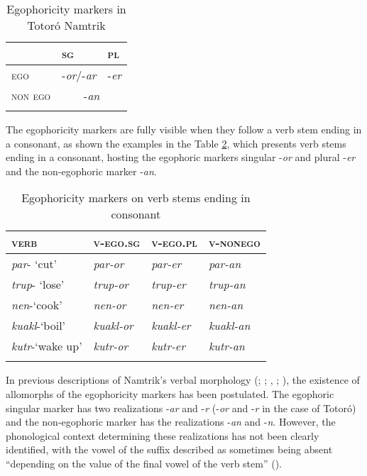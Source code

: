 \documentclass[output=paper]{langsci/langscibook}
\begin{document}
\begin{table}
\begin{tabularx}{\textwidth}{XXX}
\lsptoprule
  & \textsc{sg}  & \textsc{pl} \\
\midrule
\textsc{ego} & -\textit{or}/-\textit{ar} & -\textit{er}\\
\textsc{non ego} & \multicolumn{2}{c}{-\textit{an}}\\
\lspbottomrule
\end{tabularx}
\caption{Egophoricity markers in Totoró Namtrik}
\label{tab:gg1}
\end{table}

The egophoricity markers are fully visible when they follow a verb stem ending in a consonant, as shown the examples in the Table \ref{tab:gg2}, which presents verb stems ending in a consonant, hosting the egophoric markers singular -\textit{or} and plural -\textit{er} and the non-egophoric marker -\textit{an}.

\begin{table}
\begin{tabularx}{\textwidth}{XXXX}
\lsptoprule
\textsc{verb} & \textsc{v-ego.sg} & \textsc{v-ego.pl} & \textsc{v-nonego}\\
\midrule
\textit{par}- ‘cut’ & \textit{par-or} & \textit{par-er} & \textit{par-an}\\
\textit{trup}- ‘lose’ & \textit{trup-or} & \textit{trup-er} & \textit{trup-an}\\
\textit{nen}-‘cook’ & \textit{nen-or} & \textit{nen-er} & \textit{nen-an}\\
\textit{kuakl}-‘boil’ & \textit{kuakl-or} & \textit{kuakl-er} & \textit{kuakl-an}\\
\textit{kutr}-‘wake up’ & \textit{kutr-or} & \textit{kutr-er} & \textit{kutr-an}\\
\lspbottomrule
\end{tabularx}
\caption{Egophoricity markers on verb stems ending in consonant}
\label{tab:gg2}
\end{table}

In previous descriptions of Namtrik’s verbal morphology (\citealt{Pabon1989}; \citealt{TrivinoGarzon1989}; \citealt{Vasquez1987}, \citeyear{Vasquez1988}; \citealt{Norcliffe2018}), the existence of allomorphs of the egophoricity markers has been postulated. The egophoric singular marker has two realizations -\textit{ar} and -\textit{r} (-\textit{or} and -\textit{r} in the case of Totoró) and the non-egophoric marker has the realizations -\textit{an} and -\textit{n}. However, the phonological context determining these realizations has not been clearly identified, with the vowel of the suffix described as sometimes being absent “depending on the value of the final vowel of the verb stem” (\citealt{Norcliffe2018}).
\end{document}
